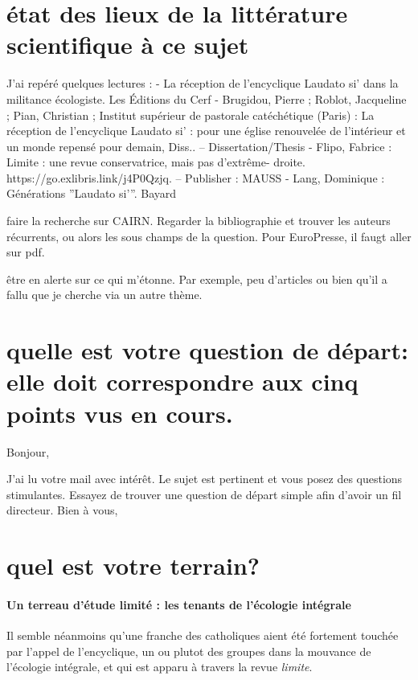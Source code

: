\section{état des lieux de la littérature scientifique à ce sujet}
J'ai repéré quelques lectures : 
- La réception de l’encyclique Laudato si’ dans la militance écologiste. Les Éditions du Cerf
- Brugidou, Pierre ; Roblot, Jacqueline ; Pian, Christian ;
Institut supérieur de pastorale catéchétique (Paris) : La réception de l’encyclique Laudato si’ : pour une église renouvelée de l’intérieur et un
monde repensé pour demain, Diss.. – Dissertation/Thesis
- Flipo, Fabrice : Limite : une revue conservatrice, mais pas d’extrême- droite. https://go.exlibris.link/j4P0Qzjq. – Publisher : MAUSS
- Lang, Dominique : Générations ”Laudato si’”. Bayard

faire la recherche sur CAIRN. Regarder la bibliographie et trouver les auteurs récurrents, ou alors les sous champs de la question. Pour EuroPresse, il faugt aller sur pdf. 

être en alerte sur ce qui m'étonne. Par exemple, peu d'articles ou bien qu'il a fallu que je cherche via un autre thème.
\section{quelle est votre question de départ: elle doit correspondre aux cinq points vus en cours.}

Bonjour,

J'ai lu votre mail avec intérêt. Le sujet est pertinent et vous posez des questions stimulantes. Essayez de trouver une question de départ simple afin d'avoir un fil directeur. 
Bien à vous,


\section{quel est votre terrain?}
\paragraph{Un terreau d'étude limité : les tenants de l'écologie intégrale} Il semble néanmoins qu'une franche des catholiques aient été fortement touchée par l'appel de l'encyclique, un ou plutot des groupes dans la mouvance de l'écologie intégrale, et qui est apparu à travers la revue \textit{limite}.

